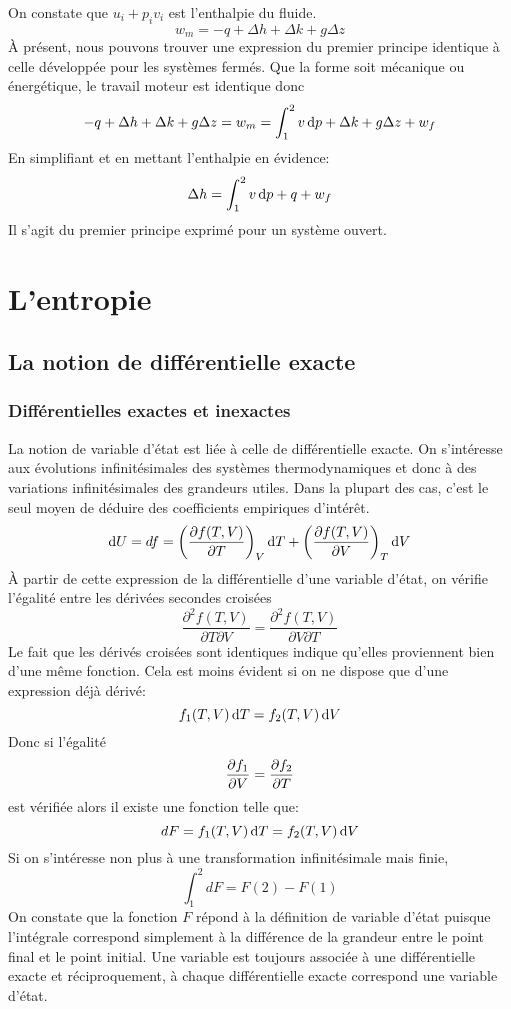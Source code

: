 On constate que $u_i + p_iv_i$ est l'enthalpie du fluide.
\[ w_m = -q + \Delta h + \Delta k +g \Delta z \]
À présent, nous pouvons trouver une expression
du premier principe identique à celle développée pour les systèmes fermés.
Que la forme soit mécanique ou énergétique,
le travail moteur est identique donc
\[ -q + \Delta h + \Delta k + g \Delta z = w_m =
\int_1^2v\operatorname{d}\! p + \Delta k + g\Delta z + w_f \]
En simplifiant et en mettant l'enthalpie en évidence:
\[ \Delta h = \int_1^2v\operatorname{d}\! p + q + w_f \]
Il s'agit du premier principe exprimé pour un système ouvert.

\section{L'entropie}
\subsection{La notion de différentielle exacte}
\subsubsection{Différentielles exactes et inexactes}
La notion de variable d'état est liée à celle de différentielle exacte.
On s'intéresse aux évolutions infinitésimales des systèmes thermodynamiques et
donc à des variations infinitésimales des grandeurs utiles.
Dans la plupart des cas,
c'est le seul moyen de déduire des coefficients empiriques d'intérêt.
\[ \operatorname{d}\! U = df = \left(\frac{\partial f(T,V)}{\partial T}\right)_V \operatorname{d}\! T +
\left ( \frac{\partial f(T,V)}{\partial V}\right ) _T \operatorname{d}\! V \]
À partir de cette expression de la différentielle d'une variable d'état,
on vérifie l'égalité entre les dérivées secondes croisées
\[ \frac{\partial^2 f(T,V)}{\partial T \partial V} =
\frac{\partial^2 f(T,V)}{\partial V \partial T} \]
Le fait que les dérivés croisées sont identiques indique
qu'elles proviennent bien d'une même fonction.
Cela est moins évident si on ne dispose que d'une expression déjà dérivé:
\[ f_1(T,V) \operatorname{d}\! T = f_2(T,V)\operatorname{d}\! V \]
Donc si l'égalité
\[ \frac{\partial f_1}{\partial V} = \frac{\partial f_2}{\partial T} \]
est vérifiée alors il existe une fonction telle que:
\[ dF = f_1(T,V) \operatorname{d}\! T = f_2(T,V)\operatorname{d}\! V  \]
Si on s'intéresse non plus à une transformation infinitésimale mais finie,
\[ \int_1^2 dF = F(2)-F(1) \]
On constate que la fonction $F$ répond à la définition de variable d'état
puisque l'intégrale correspond simplement à la différence
de la grandeur entre le point final et le point initial.
Une variable est toujours associée à une différentielle exacte et
réciproquement, à chaque différentielle exacte correspond une variable d'état.

